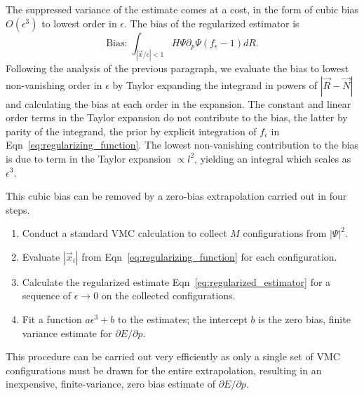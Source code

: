 \documentclass[twocolumn]{revtex4-1}
\begin{document}
The suppressed variance of the estimate comes at a cost, in the form of cubic bias $O(\epsilon^3)$ to lowest order in $\epsilon$.
The bias of the regularized estimator is
\begin{equation}
\text{Bias: } \int_{|\vec{x}/\epsilon|< 1} H\Psi \partial_p \Psi (f_\epsilon - 1) dR.
\label{eq:estimator_bias}
\end{equation}
Following the analysis of the previous paragraph, we evaluate the bias to lowest non-vanishing order in $\epsilon$ by Taylor expanding the integrand in powers of $|\vec{R} - \vec{N}|$ and calculating the bias at each order in the expansion.
The constant and linear order terms in the Taylor expansion do not contribute to the bias, the latter by parity of the integrand, the prior by explicit integration of $f_\epsilon$ in Eqn~\ref{eq:regularizing_function}.
The lowest non-vanishing contribution to the bias is due to term in the Taylor expansion $\propto l^2$, yielding an integral which scales as $\epsilon^3$.

This cubic bias can be removed by a zero-bias extrapolation carried out in four steps.
\begin{enumerate}
\item Conduct a standard VMC calculation to collect $M$ configurations from $|\Psi|^2$.
\item Evaluate $|\vec{x}_i|$ from Eqn~\ref{eq:regularizing_function} for each configuration.
\item Calculate the regularized estimate Eqn~\ref{eq:regularized_estimator} for a sequence of $\epsilon \rightarrow 0$ on the collected configurations.
\item Fit a function $a\epsilon^3 + b$ to the estimates; the intercept $b$ is the zero bias, finite variance estimate for $\partial E/\partial p$.
\end{enumerate}
This procedure can be carried out very efficiently as only a single set of VMC configurations must be drawn for the entire extrapolation, resulting in an inexpensive, finite-variance, zero bias estimate of $\partial E/\partial p$.
\end{document}
